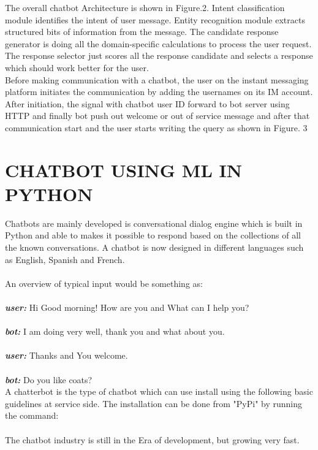 \documentclass[conference]{IEEEtran}
\begin{document}
The overall chatbot Architecture is shown in Figure.2. Intent classification module identifies the intent of user message. Entity recognition module extracts structured bits of information from the message. The candidate response generator is doing all the domain-specific calculations to process the user request. The response selector just scores all the response candidate and selects a response which should work better for the user.\\


Before making communication with a chatbot, the user on the instant messaging platform initiates the communication by adding the usernames on its IM account. After initiation, the signal with chatbot user ID forward to bot server using HTTP and finally bot push out welcome or out of service message and after that communication start and the user starts writing the query as shown in Figure. 3


\section{CHATBOT USING ML IN PYTHON}
Chatbots are mainly developed is conversational dialog engine which is built in Python and able to makes it possible to respond based on the collections of all the known conversations. A chatbot is now designed in different languages such as English, Spanish and French.\\\\
An overview of typical input would be something as:\\\\
\textit{\textbf{user:}} Hi Good morning! How are you and What can I help you?\\\\
\textit{\textbf{bot:}} I am doing very well, thank you and what about you.\\\\
\textit{\textbf{user:}} Thanks and You welcome.\\\\
\textit{\textbf{bot:}} Do you like coats?\\

A chatterbot is the type of chatbot which can use install using the following basic guidelines at service side. The installation can be done from "PyPi" by running the command:\\\\
The chatbot industry is still in the Era of development, but growing very fast.
\end{document}

